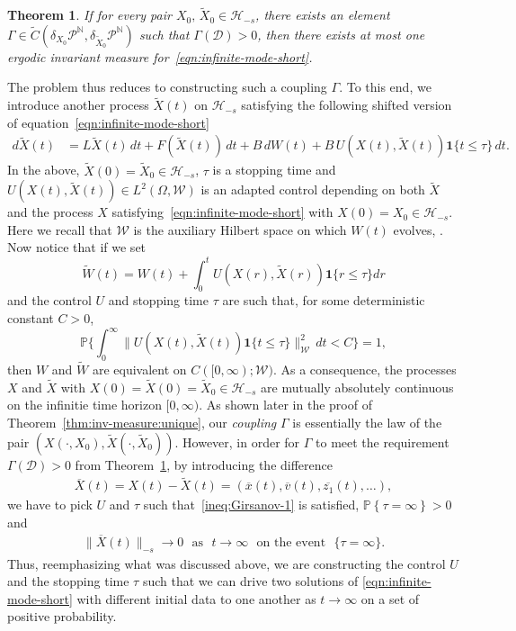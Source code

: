\documentclass[11pt]{amsart}
\theoremstyle{definition}
\newcommand{\nbb}{\mathbb{N}}
\newcommand{\W}{\mathcal{W}}
\renewcommand{\H}{\mathcal{H}}
\newcommand{\PMarkov}{\mathcal{P}}
\newcommand{\Xtil}{\widetilde{X}}
\newcommand{\Xbar}{\overline{X}}
\renewcommand{\P}[1]{\mathbb{P}\left\{#1\right\}}
\newcommand{\wt}[1]{ \widetilde{#1} }
\newcommand{\Hs}{\mathcal{H}_{-s}}
\theoremstyle{definition}
\theoremstyle{plain}
\newtheorem{theorem}{Theorem}
\numberwithin{equation}{section}
\begin{document}
\begin{theorem} \label{thm:unique:glatt}
If for every pair $X_0,\, \Xtil_0\in\Hs$, there exists an element $\Gamma\in\wt{C}(\delta_{X_0}\PMarkov^\nbb,\delta_{\Xtil_0}\PMarkov^\nbb)$ such that $\Gamma(\mathscr{D})>0$, then there exists at most one ergodic invariant measure for~\eqref{eqn:infinite-mode-short}.
\end{theorem}
The problem thus reduces to constructing such a coupling $\Gamma$. To this end, we introduce another process $\Xtil(t)$ on $\H_{-s}$ satisfying the following shifted version of equation~\eqref{eqn:infinite-mode-short}  
\begin{align} 
d\Xtil(t)&=L\Xtil(t)\, dt+F(\Xtil(t))\, dt+B\, dW(t)+B \, U(X(t),\Xtil(t))\textbf{1}\{t\leq\tau\}\, dt.\label{eqn:infinite-mode-coupling-b}
\end{align}
In the above, $\Xtil(0)=\Xtil_0\in \H_{-s}$, $\tau$ is a stopping time and $U(X(t),\Xtil(t))\in L^2\left(\Omega,\W\right)$ is an adapted control depending on both $\Xtil$ and the process $X$ satisfying~\eqref{eqn:infinite-mode-short} with $X(0)=X_0 \in \H_{-s}$. Here we recall that $\W$ is the auxiliary Hilbert space on which $W(t)$ evolves, \cite{da2014stochastic}. Now notice that if we set 
\begin{equation}\label{eqn:coupling-noise}
\widetilde{W}(t)=W(t)+\int_0^tU(X(r),\Xtil(r)) \textbf{1}\{r\leq\tau\}dr
\end{equation}
and the control $U$ and stopping time $\tau$ are such that, for some deterministic constant $C>0$,  
\begin{equation}\label{ineq:Girsanov-1}
\mathbb{P} \Big\{ \int_0^\infty \|U(X(t),\Xtil(t)) \textbf{1}\{t\leq\tau\}\|_\W^2 \, dt <C\Big\} =1,\end{equation}
then $W$ and $\wt{W}$ are equivalent on $C([0,\infty);\W)$. As a consequence, the processes $X$ and $\Xtil$ with $X(0)=\Xtil(0)= \Xtil_0\in \H_{-s}$ are mutually absolutely continuous on the infinitie time horizon $[0, \infty)$. As shown later in the proof of Theorem~\ref{thm:inv-measure:unique}, our \emph{coupling} $\Gamma$ is essentially the law of the pair $(X(\cdot,X_0),\Xtil(\cdot,\Xtil_0))$. However, in order for $\Gamma$ to meet the requirement $\Gamma(\mathscr{D})>0$ from Theorem~\ref{thm:unique:glatt}, by introducing the difference 
\begin{align}
\label{eqn:difference}
\Xbar(t)=X(t)-\Xtil(t)=\left(\overline{x}(t),\overline{v}(t),\overline{z_1}(t),\dots\right), 
\end{align}
we have to pick $U$ and $\tau$ such that~\eqref{ineq:Girsanov-1} is satisfied, $\P{\tau=\infty}>0$ and 
\begin{align*}
\|\Xbar(t)\|_{-s}\to 0 \, \, \text{ as } \,\, t\to\infty \,\, \text{ on the event } \,\, \{\tau=\infty\}. 
\end{align*}
Thus, reemphasizing what was discussed above, we are constructing the control $U$ and the stopping time $\tau$ such that we can drive two solutions of \eqref{eqn:infinite-mode-short} with different initial data to one another as $t\rightarrow \infty$ on a set of positive probability.  
\end{document}
